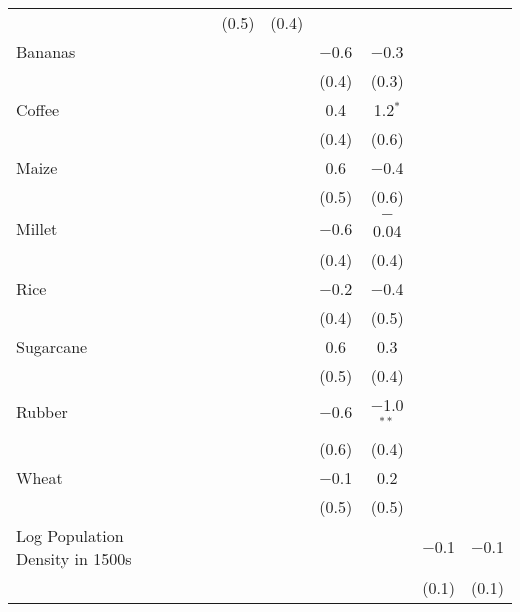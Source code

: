 \begin{table}[!htbp]
\begin{threeparttable}
\begin{tabular}{@{\extracolsep{0pt}}lcccccccccc}
  &  &  &  &  & (0.5) & (0.4) &  &  &  &  \\ 
  Bananas &  &  &  &  &  &  & $-$0.6 & $-$0.3 &  &  \\ 
  &  &  &  &  &  &  & (0.4) & (0.3) &  &  \\ 
  Coffee &  &  &  &  &  &  & 0.4 & 1.2$^{*}$ &  &  \\ 
  &  &  &  &  &  &  & (0.4) & (0.6) &  &  \\ 
  Maize &  &  &  &  &  &  & 0.6 & $-$0.4 &  &  \\ 
  &  &  &  &  &  &  & (0.5) & (0.6) &  &  \\ 
  Millet &  &  &  &  &  &  & $-$0.6 & $-$0.04 &  &  \\ 
  &  &  &  &  &  &  & (0.4) & (0.4) &  &  \\ 
  Rice &  &  &  &  &  &  & $-$0.2 & $-$0.4 &  &  \\ 
  &  &  &  &  &  &  & (0.4) & (0.5) &  &  \\ 
  Sugarcane &  &  &  &  &  &  & 0.6 & 0.3 &  &  \\ 
  &  &  &  &  &  &  & (0.5) & (0.4) &  &  \\ 
  Rubber &  &  &  &  &  &  & $-$0.6 & $-$1.0$^{**}$ &  &  \\ 
  &  &  &  &  &  &  & (0.6) & (0.4) &  &  \\ 
  Wheat &  &  &  &  &  &  & $-$0.1 & 0.2 &  &  \\ 
  &  &  &  &  &  &  & (0.5) & (0.5) &  &  \\ 
  Log Population Density in 1500s &  &  &  &  &  &  &  &  & $-$0.1 & $-$0.1 \\ 
  &  &  &  &  &  &  &  &  & (0.1) & (0.1) \\ 


\end{tabular}
\end{threeparttable}
\end{table}
